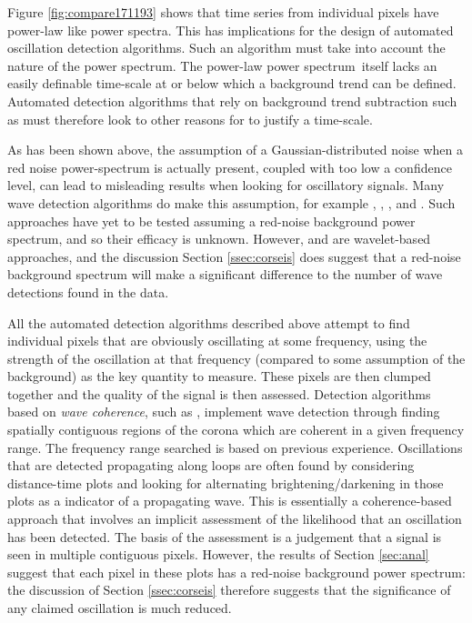 \documentclass{aastex}
\newcommand{\PS}{power spectrum}
\begin{document}
{Figure \ref{fig:compare171193} shows that time series from individual
pixels have power-law like power spectra.  This has implications for
the design of automated oscillation detection algorithms.  Such an
algorithm must take into account the nature of the \PS.
The power-law \PS\ itself lacks an easily definable
time-scale at or below which a background trend can be defined.
Automated detection algorithms that rely on background trend
subtraction such as \cite{2010SoPh..264..403I} must therefore look to
other reasons for to justify a time-scale.

As has been shown above, the assumption of a Gaussian-distributed
noise when a red noise power-spectrum is actually present, coupled
with too low a confidence level, can lead to misleading results when
looking for oscillatory signals.  Many wave detection algorithms do
make this assumption, for example \cite{2004SoPh..223....1D},
\cite{2007SoPh..241..397N}, \cite{2008SoPh..248..395S},
\cite{2010SoPh..264..403I} and \cite{2013SoPh..286..405C}.  Such
approaches have yet to be tested assuming a red-noise background power
spectrum, and so their efficacy is unknown.  However,
\cite{2004SoPh..223....1D} and \cite{2008SoPh..248..395S} are
wavelet-based approaches, and the discussion Section
\ref{ssec:corseis} does suggest that a red-noise background spectrum
will make a significant difference to the number of wave detections
found in the data.

All the automated detection algorithms described above attempt to find
individual pixels that are obviously oscillating at some frequency,
using the strength of the oscillation at that frequency (compared to
some assumption of the background) as the key quantity to measure.
These pixels are then clumped together and the quality of the signal
is then assessed.  Detection algorithms based on {\it wave coherence},
such as \cite{2008SoPh..252..321M}, implement wave detection through
finding spatially contiguous regions of the corona which are coherent
in a given frequency range.  The frequency range searched is based on
previous experience.  Oscillations that are detected propagating along
loops are often found by considering distance-time plots
\citep{2000AA...355L..23D, 2003AA...404L...1K} and looking for
alternating brightening/darkening in those plots as a indicator of a
propagating wave.  This is essentially a coherence-based approach that
involves an implicit assessment of the likelihood that an oscillation
has been detected.  The basis of the assessment is a judgement that a
signal is seen in multiple contiguous pixels.  However, the results of
Section \ref{sec:anal} suggest that each pixel in these plots has a
red-noise background \PS: the discussion of Section
\ref{ssec:corseis} therefore suggests that the significance of any
claimed oscillation is much reduced.


}
\end{document}
